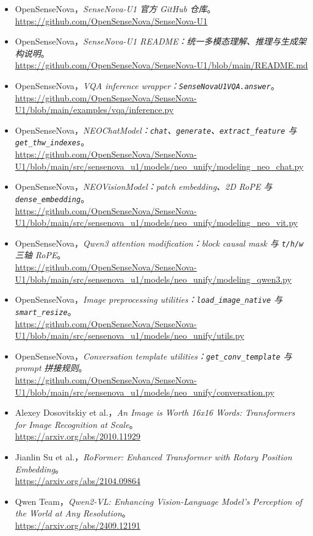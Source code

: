 \begingroup
\small
\sloppy
\begin{itemize}[leftmargin=1.5em]
  \item OpenSenseNova，\emph{SenseNova-U1 官方 GitHub 仓库}。\\
  \url{https://github.com/OpenSenseNova/SenseNova-U1}
  \item OpenSenseNova，\emph{SenseNova-U1 README：统一多模态理解、推理与生成架构说明}。\\
  \url{https://github.com/OpenSenseNova/SenseNova-U1/blob/main/README.md}
  \item OpenSenseNova，\emph{VQA inference wrapper：\texttt{SenseNovaU1VQA.answer}}。\\
  \url{https://github.com/OpenSenseNova/SenseNova-U1/blob/main/examples/vqa/inference.py}
  \item OpenSenseNova，\emph{NEOChatModel：\texttt{chat}、\texttt{generate}、\texttt{extract\_feature} 与 \texttt{get\_thw\_indexes}}。\\
  \url{https://github.com/OpenSenseNova/SenseNova-U1/blob/main/src/sensenova_u1/models/neo_unify/modeling_neo_chat.py}
  \item OpenSenseNova，\emph{NEOVisionModel：patch embedding、2D RoPE 与 \texttt{dense\_embedding}}。\\
  \url{https://github.com/OpenSenseNova/SenseNova-U1/blob/main/src/sensenova_u1/models/neo_unify/modeling_neo_vit.py}
  \item OpenSenseNova，\emph{Qwen3 attention modification：block causal mask 与 \texttt{t/h/w} 三轴 RoPE}。\\
  \url{https://github.com/OpenSenseNova/SenseNova-U1/blob/main/src/sensenova_u1/models/neo_unify/modeling_qwen3.py}
  \item OpenSenseNova，\emph{Image preprocessing utilities：\texttt{load\_image\_native} 与 \texttt{smart\_resize}}。\\
  \url{https://github.com/OpenSenseNova/SenseNova-U1/blob/main/src/sensenova_u1/models/neo_unify/utils.py}
  \item OpenSenseNova，\emph{Conversation template utilities：\texttt{get\_conv\_template} 与 prompt 拼接规则}。\\
  \url{https://github.com/OpenSenseNova/SenseNova-U1/blob/main/src/sensenova_u1/models/neo_unify/conversation.py}
  \item Alexey Dosovitskiy et al.，\emph{An Image is Worth 16x16 Words: Transformers for Image Recognition at Scale}。\\
  \url{https://arxiv.org/abs/2010.11929}
  \item Jianlin Su et al.，\emph{RoFormer: Enhanced Transformer with Rotary Position Embedding}。\\
  \url{https://arxiv.org/abs/2104.09864}
  \item Qwen Team，\emph{Qwen2-VL: Enhancing Vision-Language Model's Perception of the World at Any Resolution}。\\
  \url{https://arxiv.org/abs/2409.12191}
\end{itemize}
\endgroup
